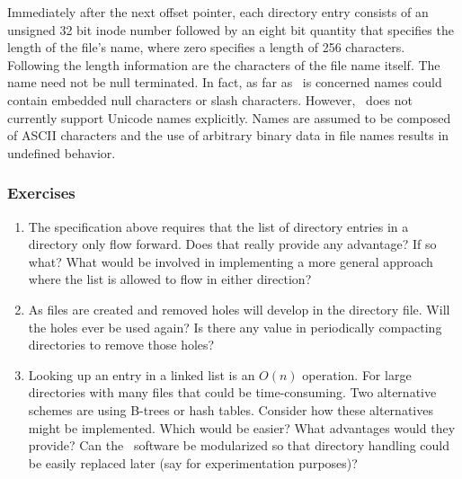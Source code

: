 Immediately after the next offset pointer, each directory entry consists of an unsigned 32 bit
inode number followed by an eight bit quantity that specifies the length of the file's name,
where zero specifies a length of 256 characters. Following the length information are the
characters of the file name itself. The name need not be null terminated. In fact, as far as
\GenericFS\ is concerned names could contain embedded null characters or slash characters.
However, \GenericFS\ does not currently support Unicode names explicitly. Names are assumed to
be composed of ASCII characters and the use of arbitrary binary data in file names results in
undefined behavior.

\subsubsection*{Exercises}

\begin{enumerate}

\item The specification above requires that the list of directory entries in a directory only
  flow forward. Does that really provide any advantage? If so what? What would be involved in
  implementing a more general approach where the list is allowed to flow in either direction?

\item As files are created and removed holes will develop in the directory file. Will the holes
  ever be used again? Is there any value in periodically compacting directories to remove those
  holes?

\item Looking up an entry in a linked list is an $O(n)$ operation. For large directories with
  many files that could be time-consuming. Two alternative schemes are using B-trees or hash
  tables. Consider how these alternatives might be implemented. Which would be easier? What
  advantages would they provide? Can the \GenericFS\ software be modularized so that directory
  handling could be easily replaced later (say for experimentation purposes)?

\end{enumerate}
